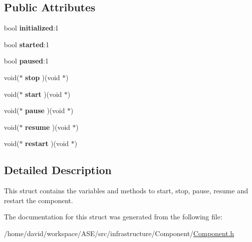 \subsection*{Public Attributes}
\begin{CompactItemize}
\item 
\hypertarget{structComponent__t_f9f9e0d8d30a6045b4434510e37af9e7}{
bool \textbf{initialized}:1}
\label{structComponent__t_f9f9e0d8d30a6045b4434510e37af9e7}

\item 
\hypertarget{structComponent__t_8c96416354a0af8d4bdd9f3735019b9e}{
bool \textbf{started}:1}
\label{structComponent__t_8c96416354a0af8d4bdd9f3735019b9e}

\item 
\hypertarget{structComponent__t_342ea28dfc026254eee4a1be81894059}{
bool \textbf{paused}:1}
\label{structComponent__t_342ea28dfc026254eee4a1be81894059}

\item 
\hypertarget{structComponent__t_09214b8474d964bcc39a4a2a831e52be}{
void($\ast$ \textbf{stop} )(void $\ast$)}
\label{structComponent__t_09214b8474d964bcc39a4a2a831e52be}

\item 
\hypertarget{structComponent__t_535a33e285dcecb0de03cf48be3a43de}{
void($\ast$ \textbf{start} )(void $\ast$)}
\label{structComponent__t_535a33e285dcecb0de03cf48be3a43de}

\item 
\hypertarget{structComponent__t_f92df59cb2719dc1a913eaf996b57031}{
void($\ast$ \textbf{pause} )(void $\ast$)}
\label{structComponent__t_f92df59cb2719dc1a913eaf996b57031}

\item 
\hypertarget{structComponent__t_15645bf95b6ee13c455097f50096d03d}{
void($\ast$ \textbf{resume} )(void $\ast$)}
\label{structComponent__t_15645bf95b6ee13c455097f50096d03d}

\item 
\hypertarget{structComponent__t_608d43be0548ffdd4c9deddd81d42a00}{
void($\ast$ \textbf{restart} )(void $\ast$)}
\label{structComponent__t_608d43be0548ffdd4c9deddd81d42a00}

\end{CompactItemize}


\subsection{Detailed Description}
This struct contains the variables and methods to start, stop, pause, resume and restart the component. 

The documentation for this struct was generated from the following file:\begin{CompactItemize}
\item 
/home/david/workspace/ASE/src/infrastructure/Component/\hyperlink{Component_8h}{Component.h}\end{CompactItemize}
